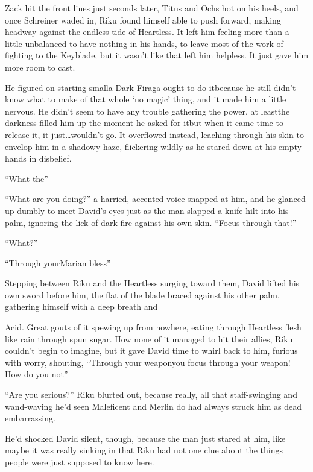Zack hit the front lines just seconds later, Titus and Ochs hot on his heels, and once Schreiner waded in, Riku found himself able to push forward, making headway against the endless tide of Heartless. It left him feeling more than a little unbalanced to have nothing in his hands, to leave most of the work of fighting to the Keyblade, but it wasn't like that left him helpless. It just gave him more room to cast.

He figured on starting small\textemdash a Dark Firaga ought to do it\textemdash because he still didn't know what to make of that whole `no magic' thing, and it made him a little nervous. He didn't seem to have any trouble gathering the power, at least\textemdash the darkness filled him up the moment he asked for it\textemdash but when it came time to release it, it just\ldots wouldn't go. It overflowed instead, leaching through his skin to envelop him in a shadowy haze, flickering wildly as he stared down at his empty hands in disbelief.

``What the\textemdash''

``What are you doing?'' a harried, accented voice snapped at him, and he glanced up dumbly to meet David's eyes just as the man slapped a knife hilt into his palm, ignoring the lick of dark fire against his own skin. ``Focus through that!''

``What?''

``Through your\textemdash Marian bless\textemdash''

Stepping between Riku and the Heartless surging toward them, David lifted his own sword before him, the flat of the blade braced against his other palm, gathering himself with a deep breath and\textemdash 

Acid. Great gouts of it spewing up from nowhere, eating through Heartless flesh like rain through spun sugar. How none of it managed to hit their allies, Riku couldn't begin to imagine, but it gave David time to whirl back to him, furious with worry, shouting, ``Through your weapon\textemdash you focus through your weapon! How do you not\textemdash''

``Are you serious?'' Riku blurted out, because really, all that staff-swinging and wand-waving he'd seen Maleficent and Merlin do had always struck him as dead embarrassing.

He'd shocked David silent, though, because the man just stared at him, like maybe it was really sinking in that Riku had not one clue about the things people were just supposed to know here.

